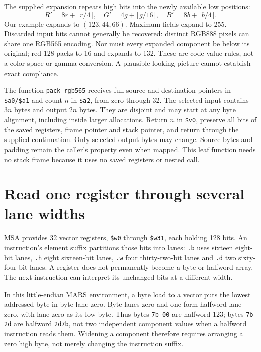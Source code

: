 The supplied expansion repeats high bits into the newly available low positions:
\[
  R'=8r+\lfloor r/4\rfloor,\quad
  G'=4g+\lfloor g/16\rfloor,\quad
  B'=8b+\lfloor b/4\rfloor.
\]
Our example expands to $(123,44,66)$. Maximum fields expand to 255. Discarded
input bits cannot generally be recovered: distinct RGB888 pixels can share one
RGB565 encoding. Nor must every expanded component be below its original; red
128 packs to 16 and expands to 132. These are code-value rules, not a color-space
or gamma conversion. A plausible-looking picture cannot establish exact compliance.

The function \texttt{pack\_rgb565} receives full source and destination pointers
in \texttt{\$a0/\$a1} and count $n$ in \texttt{\$a2}, from zero through 32. The
selected input contains $3n$ bytes and output $2n$ bytes. They are disjoint and
may start at any byte alignment, including inside larger allocations. Return $n$
in \texttt{\$v0}, preserve all bits of the saved registers, frame pointer and
stack pointer, and return through the supplied continuation. Only selected output
bytes may change. Source bytes and padding remain the caller's property even when
mapped. This leaf function needs no stack frame because it uses no saved registers
or nested call.

\section{Read one register through several lane widths}

MSA provides 32 vector registers, \texttt{\$w0} through \texttt{\$w31}, each holding
128 bits. An instruction's element suffix partitions those bits into lanes:
\texttt{.b} uses sixteen eight-bit lanes, \texttt{.h} eight sixteen-bit lanes,
\texttt{.w} four thirty-two-bit lanes and \texttt{.d} two sixty-four-bit lanes.
A register does not permanently become a byte or halfword array. The next
instruction can interpret its unchanged bits at a different width.

In this little-endian MARS environment, a byte load to a vector puts the lowest
addressed byte in byte lane zero. Byte lanes zero and one form halfword lane zero,
with lane zero as its low byte. Thus bytes \texttt{7b 00} are halfword 123; bytes
\texttt{7b 2d} are halfword \texttt{2d7b}, not two independent component values
when a halfword instruction reads them. Widening a component therefore requires
arranging a zero high byte, not merely changing the instruction suffix.

